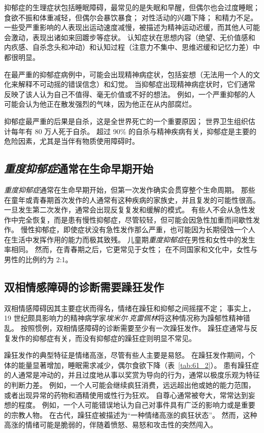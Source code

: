 抑郁症的生理症状包括睡眠障碍，最常见的是失眠和早醒，但偶尔也会过度睡眠；
食欲不振和体重减轻，但偶尔会暴饮暴食；
对性活动的兴趣下降；
和精力不足。
一些受严重影响的人表现出运动速度减慢，被描述为精神运动迟缓，而其他人可能会激动，表现出诸如来回踱步等症状。
认知症状在思想内容（绝望、无价值感和内疚感、自杀念头和冲动）和认知过程（注意力不集中、思维迟缓和记忆力差）中都很明显。


在最严重的抑郁症病例中，可能会出现精神病症状，包括妄想（无法用一个人的文化来解释不可动摇的错误信念）和幻觉。
当抑郁症出现精神病症状时，它们通常反映了该人认为自己不值得、毫无价值或不好的想法。
例如，一个严重抑郁的人可能会认为他正在散发强烈的气味，因为他正在从内部腐烂。


抑郁症最严重的后果是自杀，这是全世界死亡的一个重要原因；
世界卫生组织估计每年有 80 万人死于自杀。
超过 90\% 的自杀与精神疾病有关，抑郁症是主要的危险因素，尤其是当伴有物质使用障碍时。



\subsection{\textit{重度抑郁症}通常在生命早期开始}

\textit{重度抑郁症}通常在生命早期开始，但第一次发作确实会贯穿整个生命周期。
那些在童年或青春期首次发作的人通常有这种疾病的家族史，并且复发的可能性很高。
一旦发生第二次发作，通常会出现反复复发和缓解的模式。
有些人不会从急性发作中完全恢复，而是患有慢性抑郁症，尽管较轻，但可能会因急性加重而间歇性发作。
慢性抑郁症，即使症状没有急性发作那么严重，也可能因为长期侵蚀一个人在生活中发挥作用的能力而极其致残。
儿童期\textit{重度抑郁症}在男性和女性中的发生率相同。
然而，在青春期之后，它更常见于女性；
在不同国家和文化中，女性与男性的比例约为 2:1。



\subsection{双相情感障碍的诊断需要躁狂发作}

双相情感障碍因其主要症状而得名，情绪在躁狂和抑郁之间摇摆不定；
事实上，19 世纪颇具影响力的精神病学家\textit{埃米尔$\cdot$克雷佩林}将这种情况称为躁郁性精神错乱。
按照惯例，双相情感障碍的诊断需要至少有一次躁狂发作。
躁狂症通常与反复发作的抑郁症有关，而没有抑郁症的躁狂症则明显不常见。


躁狂发作的典型特征是情绪高涨，尽管有些人主要是易怒。
在躁狂发作期间，个体的能量显著增加，睡眠需求减少，偶尔食欲下降（表~\ref{tab:61_2}）。
患有躁狂症的人通常是冲动的，并且过度地从事以奖赏为导向的行为，通常以极度乐观为特征的判断力差。
例如，一个人可能会继续疯狂消费，远远超出他或她的能力范围，或者出现异常的药物和酒精使用或性行为狂欢。
自尊心通常被夸大，常常达到妄想的程度。
例如，一个人可能错误地认为自己对事件具有广泛的影响力或是重要的宗教人物。 在古代，躁狂症被描述为“一种情绪高涨的疯狂状态”。
然而，这种高涨的情绪可能是脆弱的，伴随着愤怒、易怒和攻击性的突然闯入。


